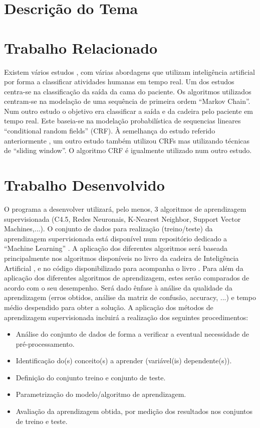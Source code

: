 \documentclass[conference]{IEEEtran}
\begin{document}
\section{Descrição do Tema}

\section{Trabalho Relacionado}
Existem vários estudos \cite{b1} \cite{b2} \cite{b3} \cite{b4}, com várias abordagens que utilizam inteligência artificial por forma a classificar atividades humanas em tempo real.
Um dos estudos \cite{b1} centra-se na classificação da saída da cama do paciente. Os algoritmos utilizados centram-se na modelação de uma sequência de primeira ordem “Markov Chain”.
Num outro estudo \cite{b2} o objetivo era classificar a saída e da cadeira pelo paciente em tempo real. Este baseia-se na modelação probabilística de sequencias lineares “conditional random fields” (CRF).
À semelhança do estudo referido anteriormente \cite{b2}, um outro estudo \cite{b3} também utilizou CRFs mas utilizando técnicas de “sliding window”.
O algoritmo CRF é igualmente utilizado num outro estudo. \cite{b4}


\section{Trabalho Desenvolvido}
O programa a desenvolver utilizará, pelo menos, 3 algoritmos de aprendizagem supervisionada (C4.5, Redes Neuronais, K-Nearest Neighbor, Support Vector Machines,...). O conjunto de dados para realização (treino/teste) da aprendizagem supervisionada está disponível num repositório dedicado a “Machine Learning” \cite{b5}.
A aplicação dos diferentes algoritmos será baseada principalmente nos algoritmos disponíveis no livro da cadeira de Inteligência Artificial \cite{b6}, e no código disponibilizado para acompanha o livro \cite{b7}.
Para além da aplicação dos diferentes algoritmos de aprendizagem, estes serão comparados de acordo com o seu desempenho. Será dado ênfase à análise da qualidade da aprendizagem (erros obtidos, análise da matriz de confusão, accuracy, ...) e tempo médio despendido para obter a solução.
A aplicação dos métodos de aprendizagem supervisionada incluirá a realização dos seguintes procedimentos: 

\begin{itemize}
	\item Análise do conjunto de dados de forma a verificar a eventual necessidade de pré-processamento.
	\item Identificação do(s) conceito(s) a aprender (variável(is) dependente(s)).
	\item Definição do conjunto treino e conjunto de teste. 
	\item Parametrização do modelo/algoritmo de aprendizagem.
	\item Avaliação da aprendizagem obtida, por medição dos resultados nos conjuntos de treino e teste.

\end{itemize}
\end{document}
